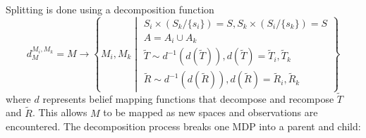 Splitting is done using a decomposition function
\begin{equation*}
d^{M_i,M_k}_{M} = M \longrightarrow \left\{    M_i, M_k \middle|
\begin{array}{l}
S_i \times ( S_k / \{s_i\} ) = S, S_k \times ( S_i / \{ s_k \} ) = S \\
A=A_i \cup A_k\\
\tilde{T}\sim d^{-1}(d(\tilde{T})),d(\tilde{T})=\tilde{T}_i, \tilde{T}_k\\
\tilde{R}\sim d^{-1}(d(\tilde{R})), d(\tilde{R})=\tilde{R}_i,\tilde{R}_k
\end{array}
 \right\}
\end{equation*}
where $d$ represents belief mapping functions that decompose and recompose $\tilde{T}$ and $\tilde{R}$. This allows  $M$ to be mapped as new spaces and observations are encountered. The decomposition process breaks one MDP into a parent and child:\\

\begin{center}
\end{center}

